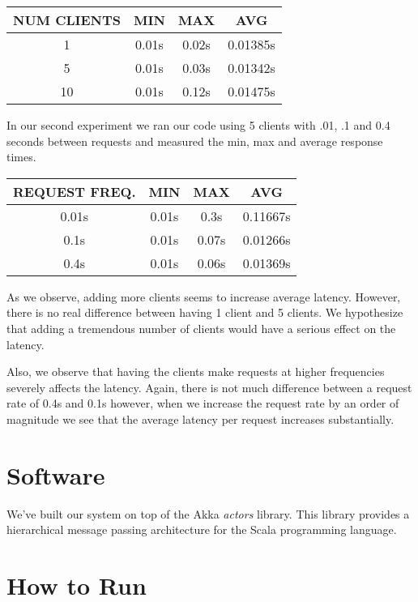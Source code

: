 \documentclass[11pt]{article}
\begin{document}
\begin{tabular}{c|c|c|c}
  NUM CLIENTS & MIN & MAX & AVG \\
  \hline
  1  & 0.01s & 0.02s & 0.01385s \\
  5  & 0.01s & 0.03s & 0.01342s \\
  10 & 0.01s & 0.12s & 0.01475s \\
\end{tabular}

In our second experiment we ran our code using 5 clients with .01, .1
and 0.4 seconds between requests and measured the min, max and
average response times.


\begin{tabular}{c|c|c|c}
  REQUEST FREQ. & MIN & MAX & AVG \\
  \hline
  0.01s & 0.01s & 0.3s  & 0.11667s \\
  0.1s  & 0.01s & 0.07s & 0.01266s \\
  0.4s  & 0.01s & 0.06s & 0.01369s \\
\end{tabular}

As we observe, adding more clients seems to increase average
latency.  However, there is no real difference between having 1 client
and 5 clients.  We hypothesize that adding a tremendous number of
clients would have a serious effect on the latency.

Also, we observe that having the clients make requests at higher
frequencies severely affects the latency.  Again, there is not much
difference between a request rate of 0.4s and 0.1s however, when we
increase the request rate by an order of magnitude we see that the
average latency per request increases substantially.

\section{Software}
We've built our system on top of the Akka \emph{actors} library.  This
library provides a hierarchical message passing architecture for the
Scala programming language.

\section{How to Run}
\end{document}
